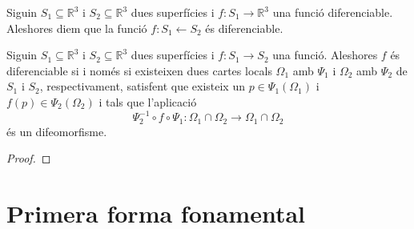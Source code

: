 \documentclass[../../Main.tex]{subfiles}
\begin{document}
	\begin{definition}
		\label{def:funció diferenciable entre superfícies}
		Siguin \(S_{1}\subseteq\mathbb{R}^{3}\) i \(S_{2}\subseteq\mathbb{R}^{3}\) dues superfícies i \(f\colon S_{1}\longrightarrow\mathbb{R}^{3}\) una funció diferenciable. Aleshores diem que la funció \(f\colon S_{1}\longleftarrow S_{2}\) és diferenciable.
	\end{definition}
	\begin{proposition}
		Siguin \(S_{1}\subseteq\mathbb{R}^{3}\) i \(S_{2}\subseteq\mathbb{R}^{3}\) dues superfícies i \(f\colon S_{1}\longrightarrow S_{2}\) una funció. Aleshores \(f\) és diferenciable si i només si existeixen dues cartes locals \(\Omega_{1}\) amb \(\Psi_{1}\) i \(\Omega_{2}\) amb \(\Psi_{2}\) de \(S_{1}\) i \(S_{2}\), respectivament, satisfent que existeix un \(p\in\Psi_{1}(\Omega_{1})\) i \(f(p)\in\Psi_{2}(\Omega_{2})\) i tals que l'aplicació
		\[\Psi_{2}^{-1}\circ f\circ \Psi_{1}\colon\Omega_{1}\cap\Omega_{2}\longrightarrow\Omega_{1}\cap\Omega_{2}\]
		és un difeomorfisme.
		\begin{proof}
		\end{proof}
	\end{proposition}
	\section{Primera forma fonamental}
\end{document}
